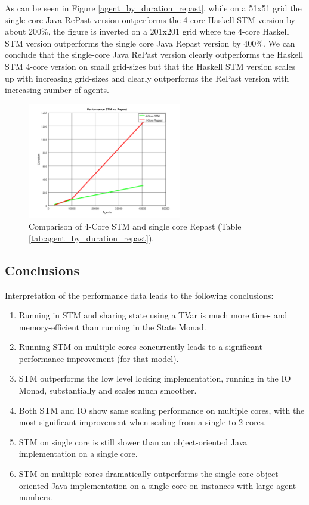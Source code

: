 As can be seen in Figure \ref{agent_by_duration_repast}, while on a 51x51 grid the single-core Java RePast version outperforms the 4-core Haskell STM version by about 200\%, the figure is inverted on a 201x201 grid where the 4-core Haskell STM version outperforms the single core Java Repast version by 400\%. We can conclude that the single-core Java RePast version clearly outperforms the Haskell STM 4-core version on small grid-sizes but that the Haskell STM version scales up with increasing grid-sizes and clearly outperforms the RePast version with increasing number of agents.

\begin{figure}
	\centering
	\includegraphics[width=0.6\textwidth, angle=0]{./fig/agents_duration_stm_repast.png}
	\caption{Comparison of 4-Core STM and single core Repast (Table \ref{tab:agent_by_duration_repast}).}
	\label{fig:agent_by_duration_repast}
\end{figure}

\subsection{Conclusions}
Interpretation of the performance data leads to the following conclusions:
\begin{enumerate}
	\item Running in STM and sharing state using a TVar is much more time- and memory-efficient than running in the State Monad.
	\item Running STM on multiple cores concurrently leads to a significant performance improvement (for that model).
	\item STM outperforms the low level locking implementation, running in the IO Monad, substantially and scales much smoother.
	\item Both STM and IO show same scaling performance on multiple cores, with the most significant improvement when scaling from a single to 2 cores.
	\item STM on single core is still slower than an object-oriented Java implementation on a single core.
	\item STM on multiple cores dramatically outperforms the single-core object-oriented Java implementation on a single core on instances with large agent numbers.
\end{enumerate}